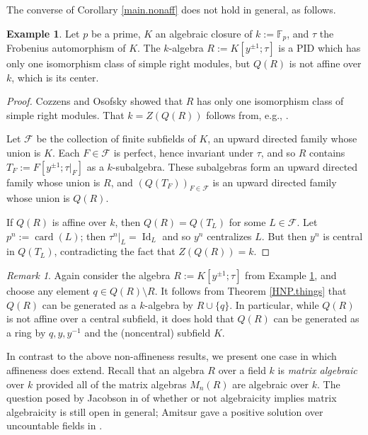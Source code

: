 \documentclass{conm-p-l}
\theoremstyle{definition}
\newtheorem{exam}[theorem]{Example}
\theoremstyle{remark}
\newtheorem{rem}[theorem]{Remark}
\numberwithin{equation}{section}
\newcommand{\FF}{\mathbb{F}}
\newcommand \calF {{\mathcal{F}}}
\DeclareMathOperator{\Id}{Id}
\DeclareMathOperator{\card}{card}
\begin{document}
The converse of Corollary \ref{main.nonaff} does not hold in general, as follows.

\begin{exam}  \label{CozOso.nonaff}
Let $p$ be a prime, $K$ an algebraic closure of $k := \FF_p$, and $\tau$ the Frobenius automorphism of $K$.  The $k$-algebra $R := K[y^{\pm1};\tau]$ is a PID which has only one isomorphism class of simple right modules, but $Q(R)$ is not affine over $k$, which is its center.
\end{exam}

\begin{proof}
Cozzens \cite[Theorem 2.3]{Coz} and Osofsky \cite[Proposition 4]{Oso} showed that $R$ has only one isomorphism class of simple right modules. That $k = Z(Q(R))$ follows from, e.g., \cite[Exercise 6\,I]{Goo-War}. 

Let $\calF$ be the collection of finite subfields of $K$, an upward directed family whose union is $K$.  Each $F \in \calF$ is perfect, hence invariant under $\tau$, and so $R$ contains $T_F := F[y^{\pm1};\tau|_F]$ as a $k$-sub\-algebra.  These subalgebras form an upward directed family whose union is $R$, and $(Q(T_F))_{F\in\calF}$ is an upward directed family whose union is $Q(R)$.

If $Q(R)$ is affine over $k$, then $Q(R) = Q(T_L)$ for some $L \in \calF$.  Let $p^n := \card(L)$; then $\tau^n|_L = \Id_L$ and so $y^n$ centralizes $L$.  But then $y^n$ is central in $Q(T_L)$, contradicting the fact that $Z(Q(R)) = k$.
\end{proof}

\begin{rem} Again consider the algebra $R := K[y^{\pm 1};\tau]$ from Example \ref{CozOso.nonaff}, and choose any element $q \in Q(R) \setminus R$. It follows from Theorem \ref{HNP.things} that $Q(R)$ can be generated as a $k$-algebra by $R \cup \{q\}$. In particular, while $Q(R)$ is not affine over a central subfield, it does hold that $Q(R)$ can be generated as a ring by $q, y, y^{-1}$ and the (noncentral) subfield $K$. 
\end{rem}

In contrast to the above non-affineness results, we present one case in which affineness does extend. Recall that an algebra $R$ over a field $k$ is \emph{matrix algebraic} over $k$ provided all of the matrix algebras $M_n(R)$ are algebraic over $k$. The question posed by Jacobson in \cite[p.695]{Jac-1945} of whether or not algebraicity implies matrix algebraicity is still open in general; Amitsur gave a positive solution over uncountable fields in \cite{Ami}.
\end{document}
